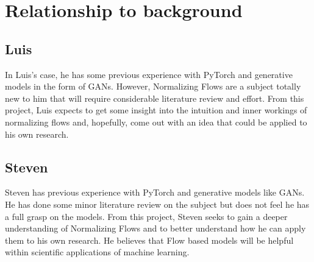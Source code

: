 \documentclass{article}
\begin{document}
\section{Relationship to background} 

\subsection{Luis} 
In Luis's case, he has some previous experience with PyTorch
and generative models in the form of GANs. However, Normalizing Flows are a
subject totally new to him that will require considerable literature review and
effort. From this project, Luis expects to get some insight into the intuition
and inner workings of normalizing flows and, hopefully, come out with an idea
that could be applied to his own research.

\subsection{Steven} 
Steven has previous experience with PyTorch and generative
models like GANs. He has done some minor literature review on the subject but
does not feel he has a full grasp on the models. From this project, Steven
seeks to gain a deeper understanding of Normalizing Flows and to better
understand how he can apply them to his own research. He believes that Flow
based models will be helpful within scientific applications of machine
learning. 

 
 
\end{document}
